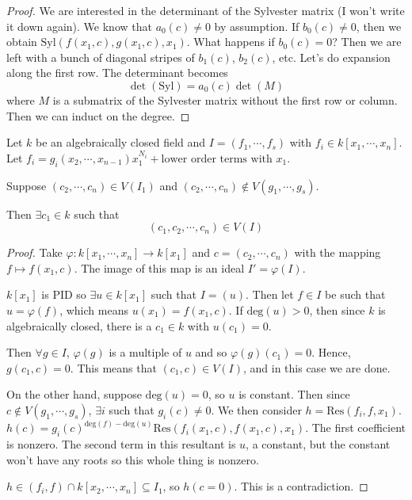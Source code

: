 \documentclass[a4paper,twoside,master.tex]{subfiles}
\begin{document}
\begin{proof}
    We are interested in the determinant of the Sylvester matrix (I won't write it down again). We know that $ a_0(c) \neq 0 $ by assumption. If $ b_0(c) \neq 0 $, then we obtain $ \text{Syl}(f(x_1, c), g(x_1, c), x_1) $. What happens if $ b_0(c) = 0 $? Then we are left with a bunch of diagonal stripes of $ b_1(c) $, $ b_2(c) $, etc. Let's do expansion along the first row. The determinant becomes
    \begin{equation}
        \det(\text{Syl}) = a_0(c) \det(M)
    \end{equation}
    where $ M $ is a submatrix of the Sylvester matrix without the first row or column. Then we can induct on the degree.
\end{proof}

\begin{theorem}
    Let $ k $ be an algebraically closed field and $ I = (f_1, \cdots, f_s) $ with $ f_i \in k[x_1, \cdots, x_n] $. Let $ f_i = g_i(x_2, \cdots, x_{n-1}) x_1^{N_i} + \text{lower order terms with } x_1 $.
    
    Suppose $ (c_2, \cdots, c_n) \in V(I_1) $ and $ (c_2, \cdots, c_n) \not\in V(g_1, \cdots, g_s) $.

    Then $ \exists c_1 \in k $ such that
    \begin{equation}
        (c_1, c_2, \cdots, c_n) \in V(I)
    \end{equation}
\end{theorem}
\begin{proof}
    Take $ \varphi \colon k[x_1, \cdots, x_n] \to k[x_1] $ and $ c = (c_2, \cdots, c_n) $ with the mapping $ f \mapsto f(x_1, c) $. The image of this map is an ideal $ I' = \varphi(I) $.

    $ k[x_1] $ is PID so $ \exists u \in k[x_1] $ such that $ I = (u) $. Then let $ f \in I $ be such that $ u = \varphi(f) $, which means $ u(x_1) = f(x_1, c) $. If $ \text{deg}(u) > 0 $, then since $ k $ is algebraically closed, there is a $ c_1 \in k $ with $ u(c_1) = 0 $. 

    Then $ \forall g \in I $, $ \varphi(g) $ is a multiple of $ u $ and so $ \varphi(g)(c_1) = 0 $. Hence, $ g(c_1, c) = 0 $. This means that $ (c_1, c) \in V(I) $, and in this case we are done.

    On the other hand, suppose $ \text{deg}(u) = 0 $, so $ u $ is constant. Then since $ c \not\in V(g_1, \cdots, g_s) $, $ \exists i $ such that $ g_i(c) \neq 0 $. We then consider $ h = \text{Res}(f_i, f, x_1) $. $ h(c) = g_i(c)^{\text{deg}(f) - \text{deg}(u)} \text{Res}(f_i(x_1, c), f(x_1, c), x_1) $. The first coefficient is nonzero. The second term in this resultant is $ u $, a constant, but the constant won't have any roots so this whole thing is nonzero.

    $ h \in (f_i, f) \cap k[x_2, \cdots, x_n] \subseteq I_1 $, so $ h(c = 0) $. This is a contradiction.
\end{proof}
\end{document}
